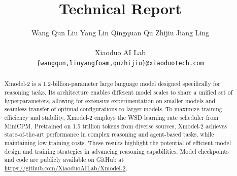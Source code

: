 \documentclass{article}
\title{\llm Technical Report }
\author{
Wang Qun
\hspace{0.8em}Liu Yang
\hspace{0.8em}Lin Qingquan
\hspace{0.8em}Qu Zhijiu
\hspace{0.8em}Jiang Ling \\ \\
Xiaoduo AI Lab \\
\texttt{\{wangqun,liuyangfoam,quzhijiu\}@xiaoduotech.com}
}
\date{}
\newcommand{\llm}{Xmodel-2\xspace}
\begin{document}
\maketitle

\begin{abstract}



\llm is a 1.2-billion-parameter large language model designed specifically for reasoning tasks. Its architecture enables different model scales to share a unified set of hyperparameters, allowing for extensive experimentation on smaller models and seamless transfer of optimal configurations to larger models. To maximize training efficiency and stability, \llm employs the WSD learning rate scheduler from MiniCPM. Pretrained on 1.5 trillion tokens from diverse sources, \llm achieves state-of-the-art performance in complex reasoning and agent-based tasks, while maintaining low training costs. These results highlight the potential of efficient model design and training strategies in advancing reasoning capabilities. Model checkpoints and code are publicly available on GitHub at \url{https://github.com/XiaoduoAILab/Xmodel-2}.







\end{abstract}
\end{document}
